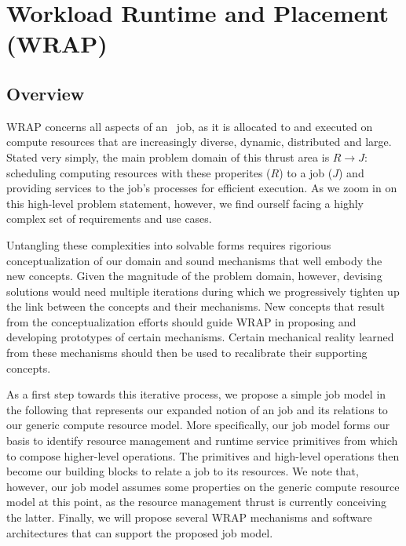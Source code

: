 \section{Workload Runtime and Placement (WRAP)}

\subsection{Overview}

WRAP concerns all aspects
of an \ngrm\ job, as it is allocated to and executed on compute resources
that are increasingly diverse, dynamic, distributed and large.
Stated very simply, the main problem domain of this thrust
area is $R \rightarrow J$: scheduling computing resources
with these properites ($R$) to a job ($J$) and providing services
to the job's processes for efficient execution. As we zoom in on
this high-level problem statement, however,
we find ourself facing a highly complex set of requirements
and use cases.

Untangling these complexities into solvable forms requires
rigorious conceptualization of our domain and
sound mechanisms that well embody the new concepts.
Given the magnitude of the problem domain, however, devising
solutions would need multiple iterations during
which we progressively tighten up the link between
the concepts and their mechanisms. New concepts that result from
the conceptualization efforts
should guide WRAP in proposing and developing
prototypes of certain mechanisms. Certain
mechanical reality learned from these mechanisms should then be
used to recalibrate their supporting concepts.

As a first step towards this iterative process,
we propose a simple job model in the following that represents
our expanded notion of an job and its relations
to our generic compute resource model.
More specifically, our job model forms our basis to identify
resource management and runtime service primitives
from which to compose higher-level operations.
The primitives and high-level operations then
become our building blocks to relate a job
to its resources. We note that, however, our job model
assumes some properties on the generic
compute resource model at this point, as the resource management thrust is
currently conceiving the latter.
Finally, we will propose several WRAP mechanisms
and software architectures that can support the proposed job model.

